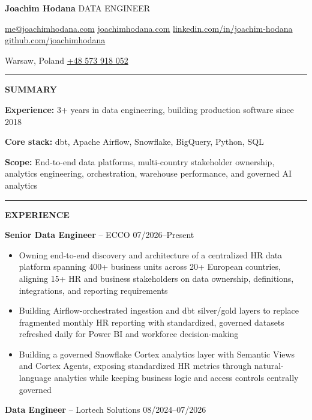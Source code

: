 \documentclass[11pt,a4paper]{article}
\newcommand{\sectionline}[1]{%
  \par\vspace{1pt}%
  \noindent\rule{\textwidth}{0.5pt}\par%
  \vspace{0pt}%
  \noindent\textbf{#1}\par%
}
\begin{document}
{\LARGE \textbf{Joachim Hodana}}
\hfill
{\large DATA ENGINEER}

\vspace{2pt}

\href{mailto:me@joachimhodana.com}{me@joachimhodana.com}
\enspace\textbullet\enspace
\href{https://joachimhodana.com}{joachimhodana.com}
\enspace\textbullet\enspace
\href{https://linkedin.com/in/joachim-hodana}{linkedin.com/in/joachim-hodana}
\enspace\textbullet\enspace
\href{https://github.com/joachimhodana}{github.com/joachimhodana}

Warsaw, Poland
\enspace\textbullet\enspace
\href{tel:+48573918052}{+48 573 918 052}

\sectionline{SUMMARY}

\textbf{Experience:} 3+ years in data engineering, building production software since 2018

\textbf{Core stack:} dbt, Apache Airflow, Snowflake, BigQuery, Python, SQL

\textbf{Scope:} End-to-end data platforms, multi-country stakeholder ownership, analytics engineering, orchestration, warehouse performance, and governed AI analytics

\sectionline{EXPERIENCE}

\textbf{Senior Data Engineer} -- ECCO
\hfill 07/2026--Present

\begin{itemize}
\item Owning end-to-end discovery and architecture of a centralized HR data platform spanning 400+ business units across 20+ European countries, aligning 15+ HR and business stakeholders on data ownership, definitions, integrations, and reporting requirements

\item Building Airflow-orchestrated ingestion and dbt silver/gold layers to replace fragmented monthly HR reporting with standardized, governed datasets refreshed daily for Power BI and workforce decision-making

\item Building a governed Snowflake Cortex analytics layer with Semantic Views and Cortex Agents, exposing standardized HR metrics through natural-language analytics while keeping business logic and access controls centrally governed
\end{itemize}

\textbf{Data Engineer} -- Lortech Solutions
\hfill 08/2024--07/2026
\end{document}
